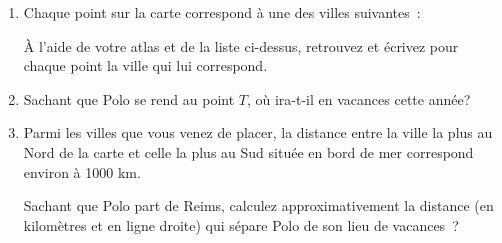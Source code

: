 \begin{TP}
\begin{enumerate}
\begin{itemize}
  \end{itemize}
 \item Chaque point sur la carte correspond à une des villes suivantes :
   À l’aide de votre atlas et de la liste ci-dessus, retrouvez et écrivez pour chaque point la ville qui lui correspond.
 \item Sachant que Polo se rend au point $T$, où ira-t-il en vacances cette année?
 \item Parmi les villes que vous venez de placer, la distance entre la ville la plus au Nord de la carte et celle la plus au Sud située en bord de mer correspond environ à 1000 km.
 
Sachant que Polo part de Reims, calculez approximativement la distance (en kilomètres et en ligne droite) qui sépare Polo de son lieu de vacances ?
  \end{enumerate}
\end{TP}


